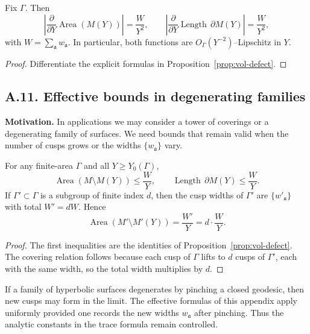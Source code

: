 \begin{proposition}\label{prop:lipschitz-Y}
Fix $\Gamma$. Then
\[
\left|\frac{\partial}{\partial Y}\operatorname{Area}(M(Y))\right|
=\frac{W}{Y^2},\qquad
\left|\frac{\partial}{\partial Y}\operatorname{Length}\,\partial M(Y)\right|
=\frac{W}{Y^2},
\]
with $W=\sum_{\mathfrak a} w_{\mathfrak a}$. In particular, both functions are
$O_\Gamma(Y^{-2})$–Lipschitz in $Y$.
\end{proposition}

\begin{proof}
Differentiate the explicit formulas in Proposition~\ref{prop:vol-defect}.
\end{proof}


\subsection*{A.11. Effective bounds in degenerating families}

\noindent
\textbf{Motivation.}
In applications we may consider a tower of coverings or a degenerating family of
surfaces. We need bounds that remain valid when the number of cusps grows or the
widths $\{w_{\mathfrak a}\}$ vary.

\begin{lemma}\label{lem:family}
For any finite-area $\Gamma$ and all $Y\ge Y_0(\Gamma)$,
\[
\operatorname{Area}(M\setminus M(Y))\le \frac{W}{Y},\qquad
\operatorname{Length}\,\partial M(Y)\le \frac{W}{Y}.
\]
If $\Gamma'\subset \Gamma$ is a subgroup of finite index $d$, then the cusp
widths of $\Gamma'$ are $\{w'_{\mathfrak a}\}$ with total $W' = dW$. Hence
\[
\operatorname{Area}(M'\setminus M'(Y))=\frac{W'}{Y}=d\cdot\frac{W}{Y}.
\]
\end{lemma}

\begin{proof}
The first inequalities are the identities of Proposition~\ref{prop:vol-defect}.
The covering relation follows because each cusp of $\Gamma$ lifts to $d$ cusps
of $\Gamma'$, each with the same width, so the total width multiplies by $d$.
\end{proof}

\begin{remark}
If a family of hyperbolic surfaces degenerates by pinching a closed geodesic,
then new cusps may form in the limit. The effective formulas of this appendix
apply uniformly provided one records the new widths $w_{\mathfrak a}$ after
pinching. Thus the analytic constants in the trace formula remain controlled.
\end{remark}


